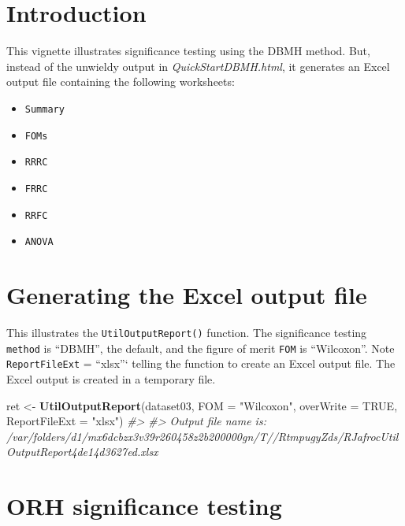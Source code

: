 \documentclass[
]{book}
\newenvironment{Shaded}{\begin{snugshade}}{\end{snugshade}}
\newcommand{\CommentTok}[1]{\textcolor[rgb]{0.56,0.35,0.01}{\textit{#1}}}
\newcommand{\DataTypeTok}[1]{\textcolor[rgb]{0.13,0.29,0.53}{#1}}
\newcommand{\KeywordTok}[1]{\textcolor[rgb]{0.13,0.29,0.53}{\textbf{#1}}}
\newcommand{\NormalTok}[1]{#1}
\newcommand{\OtherTok}[1]{\textcolor[rgb]{0.56,0.35,0.01}{#1}}
\newcommand{\StringTok}[1]{\textcolor[rgb]{0.31,0.60,0.02}{#1}}
\providecommand{\tightlist}{%
  \setlength{\itemsep}{0pt}\setlength{\parskip}{0pt}}
\begin{document}
\hypertarget{introduction-5}{%
\section{Introduction}\label{introduction-5}}

This vignette illustrates significance testing using the DBMH method. But, instead of the unwieldy output in \emph{QuickStartDBMH.html}, it generates an Excel output file containing the following worksheets:

\begin{itemize}
\tightlist
\item
  \texttt{Summary}
\item
  \texttt{FOMs}
\item
  \texttt{RRRC}
\item
  \texttt{FRRC}
\item
  \texttt{RRFC}
\item
  \texttt{ANOVA}
\end{itemize}

\hypertarget{generating-the-excel-output-file}{%
\section{Generating the Excel output file}\label{generating-the-excel-output-file}}

This illustrates the \texttt{UtilOutputReport()} function. The significance testing \texttt{method} is ``DBMH'', the default, and the figure of merit \texttt{FOM} is ``Wilcoxon''. Note \texttt{ReportFileExt} = ``xlsx''` telling
the function to create an Excel output file. The Excel output is created in a temporary file.

\begin{Shaded}
\begin{Highlighting}[]
\NormalTok{ret \textless{}{-}}\StringTok{ }\KeywordTok{UtilOutputReport}\NormalTok{(dataset03, }\DataTypeTok{FOM =} \StringTok{"Wilcoxon"}\NormalTok{, }\DataTypeTok{overWrite =} \OtherTok{TRUE}\NormalTok{, }\DataTypeTok{ReportFileExt =} \StringTok{"xlsx"}\NormalTok{)}
\CommentTok{\#\textgreater{} }
\CommentTok{\#\textgreater{} Output file name is:      /var/folders/d1/mx6dcbzx3v39r260458z2b200000gn/T//RtmpugyZds/RJafrocUtilOutputReport4de14d3627ed.xlsx}
\end{Highlighting}
\end{Shaded}

\hypertarget{orh-significance-testing-1}{%
\section{ORH significance testing}\label{orh-significance-testing-1}}
\end{document}
